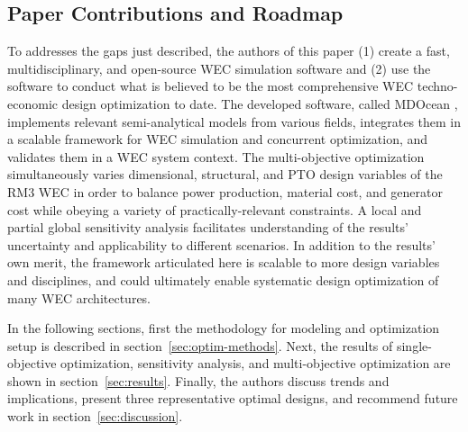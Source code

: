 \subsection{Paper Contributions and Roadmap}
To addresses the gaps just described, the authors of this paper (1) create a fast, multidisciplinary, and open-source WEC simulation software and (2) use the software to conduct what is believed to be the most comprehensive WEC techno-economic design optimization to date.
The developed software, called MDOcean \cite{mccabe_mdocean_2024}, implements relevant semi-analytical models from various fields, integrates them in a scalable framework for WEC simulation and concurrent optimization, and validates them in a WEC system context.
The multi-objective optimization simultaneously varies dimensional, structural, and PTO design variables of the RM3 WEC in order to balance power production, material cost, and generator cost while obeying a variety of practically-relevant constraints.
A local and partial global sensitivity analysis facilitates understanding of the results' uncertainty and applicability to different scenarios.
In addition to the results' own merit, the framework articulated here is scalable to more design variables and disciplines, and could ultimately enable systematic design optimization of many WEC architectures.

In the following sections, first the methodology for modeling and optimization setup is described in section~\ref{sec:optim-methods}.
Next, the results of single-objective optimization, sensitivity analysis, and multi-objective optimization are shown in section~\ref{sec:results}.
Finally, the authors discuss trends and implications, present three representative optimal designs, and recommend future work in section~\ref{sec:discussion}.
